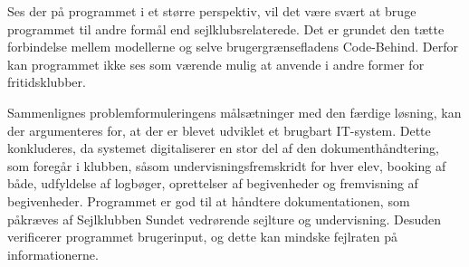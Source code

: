 Ses der på programmet i et større perspektiv, vil det være svært at bruge programmet til andre formål end sejlklubsrelaterede. 
Det er grundet den tætte forbindelse mellem modellerne og selve brugergrænsefladens Code-Behind. 
Derfor kan programmet ikke ses som værende mulig at anvende i andre former for fritidsklubber. 

Sammenlignes problemformuleringens målsætninger med den færdige løsning, kan der argumenteres for, at der er blevet udviklet et brugbart IT-system. 
Dette konkluderes, da systemet digitaliserer en stor del af den dokumenthåndtering, som foregår i klubben, såsom undervisningsfremskridt for hver elev, booking af både, udfyldelse af logbøger, oprettelser af begivenheder og fremvisning af begivenheder.
Programmet er god til at håndtere dokumentationen, som påkræves af Sejlklubben Sundet vedrørende sejlture og undervisning.
Desuden verificerer programmet brugerinput, og dette kan mindske fejlraten på informationerne.